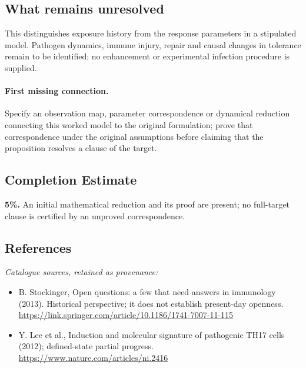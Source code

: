 \documentclass[11pt]{article}
\begin{document}
\subsection{What remains unresolved}
This distinguishes exposure history from the response parameters in a stipulated model. Pathogen dynamics, immune injury, repair and causal changes in tolerance remain to be identified; no enhancement or experimental infection procedure is supplied.
\paragraph{First missing connection.} Specify an observation map, parameter correspondence or dynamical reduction connecting this worked model to the original formulation; prove that correspondence under the original assumptions before claiming that the proposition resolves a clause of the target.
\subsection{Completion Estimate}
\textbf{5\%.} An initial mathematical reduction and its proof are present; no full-target clause is certified by an unproved correspondence.
\subsection{References}
\noindent\emph{Catalogue sources, retained as provenance:}
\begin{itemize}
\item B. Stockinger, Open questions: a few that need answers in immunology (2013). Historical perspective; it does not establish present-day openness. \url{https://link.springer.com/article/10.1186/1741-7007-11-115}
\item Y. Lee et al., Induction and molecular signature of pathogenic TH17 cells (2012); defined-state partial progress. \url{https://www.nature.com/articles/ni.2416}
\end{itemize}
\end{document}
